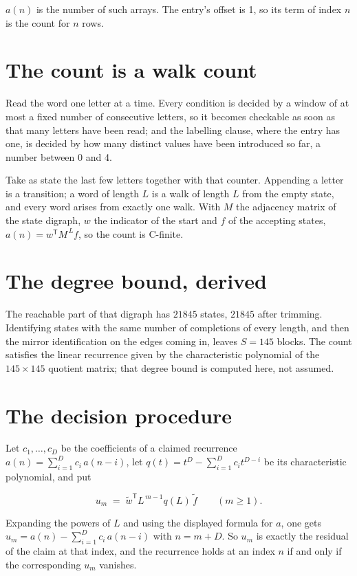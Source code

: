 \documentclass[11pt]{article}
\theoremstyle{definition}
\begin{document}
$a(n)$ is the number of such arrays. The entry's offset is 1, so its term of index $n$ is the count for $n$ rows.

\section{The count is a walk count}

Read the word one letter at a time. Every condition is decided by a window of at most a fixed number of consecutive letters, so it becomes checkable as soon as that many letters have been read; and the labelling clause, where the entry has one, is decided by how many distinct values have been introduced so far, a number between $0$ and 4.

Take as state the last few letters together with that counter. Appending a letter is a transition; a word of length $L$ is a walk of length $L$ from the empty state, and every word arises from exactly one walk. With $M$ the adjacency matrix of the state digraph, $w$ the indicator of the start and $f$ of the accepting states, $a(n) = w^{\mathsf T}M^{\,L}f$, so the count is C-finite.

\section{The degree bound, derived}

The reachable part of that digraph has $21845$ states, $21845$ after trimming. Identifying states with the same number of completions of every length, and then the mirror identification on the edges coming in, leaves $S = 145$ blocks. The count satisfies the linear recurrence given by the characteristic polynomial of the $145\times145$ quotient matrix; that degree bound is computed here, not assumed.

\section{The decision procedure}

Let $c_1,\dots,c_D$ be the coefficients of a claimed recurrence $a(n) = \sum_{i=1}^{D} c_i\,a(n-i)$, let $q(t) = t^{D} - \sum_{i=1}^{D} c_i t^{D-i}$ be its characteristic polynomial, and put

\[u_m \;=\; \tilde w^{\mathsf T} L^{\,m-1} q(L)\,\tilde f \qquad (m \ge 1).\]

Expanding the powers of $L$ and using the displayed formula for $a$, one gets $u_m = a(n) - \sum_{i=1}^{D} c_i\,a(n-i)$ with $n = m + D$. So $u_m$ is exactly the residual of the claim at that index, and the recurrence holds at an index $n$ if and only if the corresponding $u_m$ vanishes.
\end{document}
